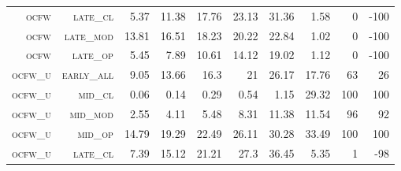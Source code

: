 \begin{landscape}
\begin{table}[!htbp]
\begin{tabular}{@{}rrrrrrr|rrr@{}}
\footnotesize \textsc{ocfw}        & \footnotesize \textsc{late\_cl  }      & \footnotesize 5.37           & \footnotesize 11.38            & \footnotesize 17.76     & \footnotesize 23.13           & \footnotesize 31.36      & \footnotesize 1.58     & \footnotesize 0     & \footnotesize -100      \\
\footnotesize \textsc{ocfw}        & \footnotesize \textsc{late\_mod }      & \footnotesize 13.81          & \footnotesize 16.51            & \footnotesize 18.23     & \footnotesize 20.22           & \footnotesize 22.84      & \footnotesize 1.02     & \footnotesize 0     & \footnotesize -100      \\
\footnotesize \textsc{ocfw}        & \footnotesize \textsc{late\_op  }      & \footnotesize 5.45           & \footnotesize 7.89             & \footnotesize 10.61     & \footnotesize 14.12           & \footnotesize 19.02      & \footnotesize 1.12     & \footnotesize 0     & \footnotesize -100      \\
\footnotesize \textsc{ocfw\_u}     & \footnotesize \textsc{early\_all}      & \footnotesize 9.05           & \footnotesize 13.66            & \footnotesize 16.3      & \footnotesize 21              & \footnotesize 26.17      & \footnotesize 17.76    & \footnotesize 63    & \footnotesize 26       \\
\footnotesize \textsc{ocfw\_u}     & \footnotesize \textsc{mid\_cl   }      & \footnotesize 0.06           & \footnotesize 0.14             & \footnotesize 0.29      & \footnotesize 0.54            & \footnotesize 1.15       & \footnotesize 29.32    & \footnotesize 100   & \footnotesize 100      \\
\footnotesize \textsc{ocfw\_u}     & \footnotesize \textsc{mid\_mod  }      & \footnotesize 2.55           & \footnotesize 4.11             & \footnotesize 5.48      & \footnotesize 8.31            & \footnotesize 11.38      & \footnotesize 11.54    & \footnotesize 96    & \footnotesize 92       \\
\footnotesize \textsc{ocfw\_u}     & \footnotesize \textsc{mid\_op   }      & \footnotesize 14.79          & \footnotesize 19.29            & \footnotesize 22.49     & \footnotesize 26.11           & \footnotesize 30.28      & \footnotesize 33.49    & \footnotesize 100   & \footnotesize 100      \\
\footnotesize \textsc{ocfw\_u}     & \footnotesize \textsc{late\_cl  }      & \footnotesize 7.39           & \footnotesize 15.12            & \footnotesize 21.21     & \footnotesize 27.3            & \footnotesize 36.45      & \footnotesize 5.35     & \footnotesize 1     & \footnotesize -98      \\

\end{tabular}
\end{table}
\end{landscape}
